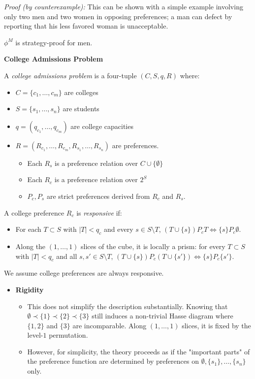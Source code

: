 \documentclass[8pt]{scrartcl}
\newcommand{\abs}[1]{\left|#1\right|}
\renewcommand{\section}[1]{\begin{center}\textbf{\color{red}#1}\end{center}}
\begin{document}
\begin{multicols*}{2}
\textit{Proof (by counterexample):} This can be shown with a simple example involving only two men and two women in opposing preferences; a man can defect by reporting that his less favored woman is unacceptable.

    $\phi^M$ is strategy-proof for men.

\section{College Admissions Problem}

A \textit{college admissions problem} is a four-tuple $(C,S,q,R)$ where:
\begin{itemize}
    \item $C = \{c_1, \dots, c_m\}$ are colleges
    \item $S = \{s_1, \dots, s_n\}$ are students
    \item $q = (q_{c_1}, \dots, q_{c_m})$ are college capacities
    \item $R = (R_{c_1}, \dots, R_{c_m}, R_{s_1}, \dots, R_{s_n})$ are preferences.
    \begin{itemize}
        \item Each $R_s$ is a preference relation over $C \cup \{\emptyset\}$
        \item Each $R_c$ is a preference relation over $2^S$
        \item $P_c, P_s$ are strict preferences derived from $R_c$ and $R_s$.
    \end{itemize}
\end{itemize}

A college preference $R_c$ is \textit{responsive} if:
\begin{itemize}
    \item For each $T \subset S$ with $\abs{T} < q_c$ and every $s \in S \setminus T$, $(T \cup \{s\}) P_c T \iff \{s\} P_c \emptyset$.
    \item Along the $(1, \dots, 1)$ slices of the cube, it is locally a prism: for every $T \subset S$ with $\abs{T} < q_c$ and all $s, s' \in S \setminus T$, $(T \cup \{s\}) P_c (T \cup \{s'\}) \iff \{s\} P_c \{s'\}$.
\end{itemize}

We assume college preferences are always responsive.

\begin{itemize}
    \item \textbf{Rigidity}
    \begin{itemize}
        \item This does not simplify the description substantially. Knowing that $\emptyset \prec \{1\} \prec \{2\} \prec \{3\}$ still induces a non-trivial Hasse diagram where $\{1,2\}$ and $\{3\}$ are incomparable. Along $(1, \dots, 1)$ slices, it is fixed by the level-$1$ permutation.
        \item However, for simplicity, the theory proceeds as if the "important parts" of the preference function are determined by preferences on $\emptyset, \{s_1\}, \dots, \{s_n\}$ only.
    \end{itemize}
\end{itemize}


\end{multicols*}
\end{document}
